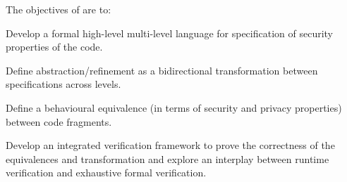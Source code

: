 \addtocounter{wpno}{1}
\begin{Workpackage}{\thewpno}
\WPTitle{\wpname{\thewpno}}


\begin{WPObjectives}
The objectives of \theWP{} are to:
\begin{compactitem}
\item Develop a formal high-level multi-level language for specification of security properties of the code. 

\item Define abstraction/refinement as a bidirectional transformation between specifications across levels.


\item Define a behavioural equivalence (in terms of security and privacy properties) between code fragments.


\item Develop an integrated verification framework to prove the correctness of the equivalences and transformation and 
explore an interplay between runtime verification and exhaustive formal verification.


\end{compactitem}
\end{WPObjectives}
\end{Workpackage}
